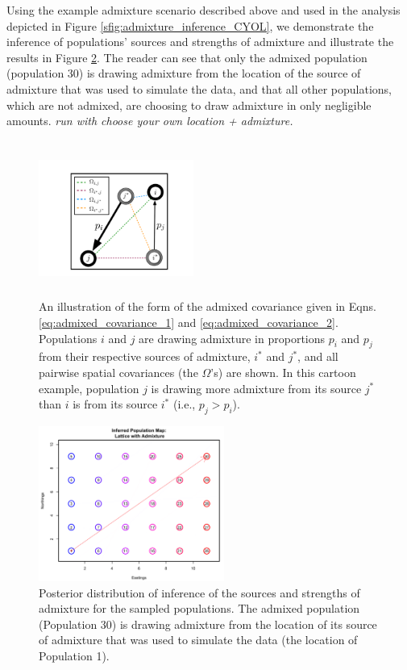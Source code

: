 \documentclass[12pt]{article}
\newcommand{\identifyadmixsource}[1]{{#1^{*}}}
\newcommand{\gc}[1]{{\em \color{blue} #1}}
\begin{document}
Using the example admixture scenario described above and used in the analysis depicted in Figure \ref{sfig:admixture_inference_CYOL}, we demonstrate the inference of populations' sources and strengths of admixture and illustrate the results in Figure \ref{sfig:corner_admixture_just_adinf}.  The reader can see that only the admixed population (population 30) is drawing admixture from the location of the source of admixture that was used to simulate the data, and that all other populations, which are not admixed, are choosing to draw admixture in only negligible amounts. \gc{run with choose your own location + admixture.}

\begin{figure}[ht!]
	\centering
	\includegraphics[width=2in,height=2in]{figs/admix_cov_fig.pdf}
	\caption{An illustration of the form of the admixed covariance given in Eqns. \eqref{eq:admixed_covariance_1} and \eqref{eq:admixed_covariance_2}.  Populations $i$ and $j$ are drawing admixture in proportions $p_i$ and $p_j$ from their respective sources of admixture, $\identifyadmixsource{i}$ and $\identifyadmixsource{j}$, and all pairwise spatial covariances (the $\Omega$'s) are shown.  In this cartoon example, population $j$ is drawing more admixture from its source $\identifyadmixsource{j}$ than $i$ is from its source $\identifyadmixsource{i}$ (i.e., $p_j > p_i$).}\label{sfig:admixed_cov_diagram}
\end{figure}


\begin{figure}[ht!]
	\centering
	\includegraphics[width=2.4in,height=2in]{figs/sims/GeoGenMap_corner_admixture_adinf.png}
	\caption{Posterior distribution of inference of the sources and strengths of admixture for the sampled populations.  The admixed population (Population 30) is drawing admixture from the location of its source of admixture that was used to simulate the data (the location of Population 1).}\label{sfig:corner_admixture_just_adinf}
\end{figure}
\end{document}
